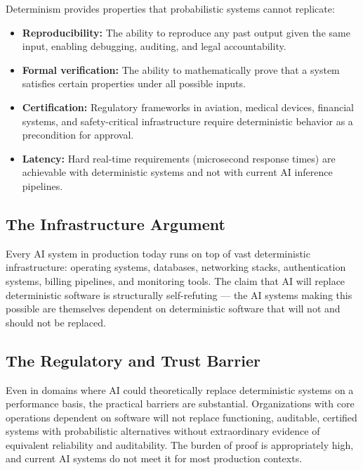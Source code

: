 \documentclass[12pt]{article}
\theoremstyle{plain}
\begin{document}
Determinism provides properties that probabilistic systems cannot replicate:

\begin{itemize}[noitemsep]
    \item \textbf{Reproducibility:} The ability to reproduce any past output given the same input, enabling debugging, auditing, and legal accountability.
    \item \textbf{Formal verification:} The ability to mathematically prove that a system satisfies certain properties under all possible inputs.
    \item \textbf{Certification:} Regulatory frameworks in aviation, medical devices, financial systems, and safety-critical infrastructure require deterministic behavior as a precondition for approval.
    \item \textbf{Latency:} Hard real-time requirements (microsecond response times) are achievable with deterministic systems and not with current AI inference pipelines.
\end{itemize}

\subsection{The Infrastructure Argument}

Every AI system in production today runs on top of vast deterministic infrastructure: operating systems, databases, networking stacks, authentication systems, billing pipelines, and monitoring tools. The claim that AI will replace deterministic software is structurally self-refuting --- the AI systems making this possible are themselves dependent on deterministic software that will not and should not be replaced.

\subsection{The Regulatory and Trust Barrier}

Even in domains where AI could theoretically replace deterministic systems on a performance basis, the practical barriers are substantial. Organizations with core operations dependent on software will not replace functioning, auditable, certified systems with probabilistic alternatives without extraordinary evidence of equivalent reliability and auditability. The burden of proof is appropriately high, and current AI systems do not meet it for most production contexts.

\end{document}
